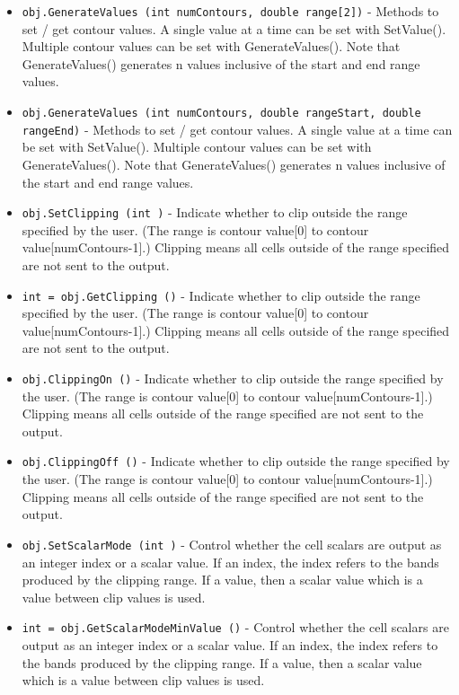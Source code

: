 \begin{itemize}
\item  \verb|obj.GenerateValues (int numContours, double range[2])| -  Methods to set / get contour values. A single value at a time can be
 set with SetValue(). Multiple contour values can be set with
 GenerateValues(). Note that GenerateValues() generates n values
 inclusive of the start and end range values.

\item  \verb|obj.GenerateValues (int numContours, double rangeStart, double rangeEnd)| -  Methods to set / get contour values. A single value at a time can be
 set with SetValue(). Multiple contour values can be set with
 GenerateValues(). Note that GenerateValues() generates n values
 inclusive of the start and end range values.

\item  \verb|obj.SetClipping (int )| -  Indicate whether to clip outside the range specified by the user.
 (The range is contour value[0] to contour value[numContours-1].)
 Clipping means all cells outside of the range specified are not
 sent to the output.

\item  \verb|int = obj.GetClipping ()| -  Indicate whether to clip outside the range specified by the user.
 (The range is contour value[0] to contour value[numContours-1].)
 Clipping means all cells outside of the range specified are not
 sent to the output.

\item  \verb|obj.ClippingOn ()| -  Indicate whether to clip outside the range specified by the user.
 (The range is contour value[0] to contour value[numContours-1].)
 Clipping means all cells outside of the range specified are not
 sent to the output.

\item  \verb|obj.ClippingOff ()| -  Indicate whether to clip outside the range specified by the user.
 (The range is contour value[0] to contour value[numContours-1].)
 Clipping means all cells outside of the range specified are not
 sent to the output.

\item  \verb|obj.SetScalarMode (int )| -  Control whether the cell scalars are output as an integer index or
 a scalar value. If an index, the index refers to the bands produced
 by the clipping range. If a value, then a scalar value which is a 
 value between clip values is used.

\item  \verb|int = obj.GetScalarModeMinValue ()| -  Control whether the cell scalars are output as an integer index or
 a scalar value. If an index, the index refers to the bands produced
 by the clipping range. If a value, then a scalar value which is a 
 value between clip values is used.


\end{itemize}
